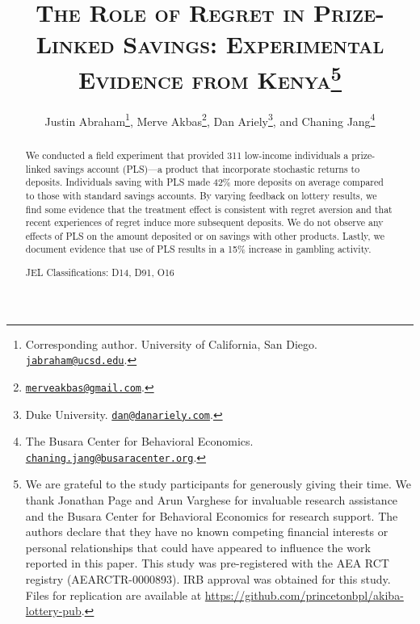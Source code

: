 \documentclass[12pt]{article}
\begin{document}
\title{\textsc{The Role of Regret in Prize-Linked Savings: Experimental Evidence from Kenya}\protect\footnote{We are grateful to the study participants for generously giving their time. We thank Jonathan Page and Arun Varghese for invaluable research assistance and the Busara Center for Behavioral Economics for research support. The authors declare that they have no known competing financial interests or personal relationships that could have appeared to influence the work reported in this paper. This study was pre-registered with the AEA RCT registry (AEARCTR-0000893). IRB approval was obtained for this study. Files for replication are available at \url{https://github.com/princetonbpl/akiba-lottery-pub}.}}

\author{
    Justin Abraham\thanks{Corresponding author. University of California, San Diego. \protect\href{mailto:jabraham@ucsd.edu}{\nolinkurl{jabraham@ucsd.edu}}.},
    Merve Akbas\thanks{\protect\href{mailto:merveakbas@gmail.com}{\nolinkurl{merveakbas@gmail.com}}.},
    Dan Ariely\thanks{Duke University. \protect\href{mailto:dan@danariely.com}{\nolinkurl{dan@danariely.com}}.}, and
    Chaning Jang\thanks{The Busara Center for Behavioral Economics. \protect\href{mailto:chaning.jang@busaracenter.org}{\nolinkurl{chaning.jang@busaracenter.org}}.}
}

\maketitle

	\begin{abstract}

		We conducted a field experiment that provided 311 low-income individuals a prize-linked savings account (PLS)---a product that incorporate stochastic returns to deposits. Individuals saving with PLS made 42\% more deposits on average compared to those with standard savings accounts. By varying feedback on lottery results, we find some evidence that the treatment effect is consistent with regret aversion and that recent experiences of regret induce more subsequent deposits. We do not observe any effects of PLS on the amount deposited or on savings with other products. Lastly, we document evidence that use of PLS results in a 15\% increase in gambling activity.

		\medskip \noindent
		JEL Classifications: D14, D91, O16

 	\end{abstract}

\newpage
\end{document}
